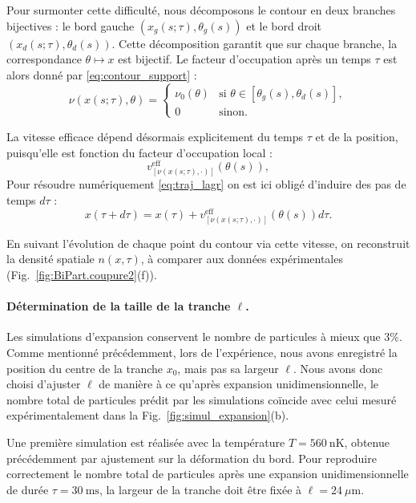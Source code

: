 Pour surmonter cette difficulté, nous décomposons le contour en deux branches bijectives : le bord gauche \((x_g(s;\tau), \theta_g(s))\) et le bord droit \((x_d(s;\tau), \theta_d(s))\). Cette décomposition garantit que sur chaque branche, la correspondance \(\theta \mapsto x\) est bijectif. Le facteur d’occupation après un temps \(\tau\) est alors donné par \eqref{eq:contour_support} :
\begin{equation}
\label{eq:contour_exp}
\nu ( x(s;\tau), \theta ) = 
\begin{cases}
\nu_0(\theta) & \text{si } \theta \in [\theta_g(s), \theta_d(s)], \\
0 & \text{sinon}.
\end{cases}
\end{equation}

La vitesse efficace dépend désormais explicitement du temps $\tau$ et de la position, puisqu’elle est fonction du facteur d’occupation local :
\[
v^{\mathrm{eff}}_{[\nu(x(s;\tau),\cdot)]}(\theta(s)),
\]
Pour résoudre numériquement \eqref{eq:traj_lagr} on est ici obligé d'induire des pas de temps $d\tau$ : 
\[
	x(\tau +d\tau ) = x(\tau ) + v^{\mathrm{eff}}_{[\nu(x(s;\tau),\cdot)]} (\theta(s))d \tau.
\]

En suivant l’évolution de chaque point du contour via cette vitesse, on reconstruit la densité spatiale \(n(x,\tau)\), à comparer aux données expérimentales (Fig.~\ref{fig:BiPart.coupure2}(f)).

\medskip

\paragraph{Détermination de la taille de la tranche \(\ell\).}

Les simulations d’expansion conservent le nombre de particules à mieux que \(3\%\). Comme mentionné précédemment, lors de l’expérience, nous avons enregistré la position du centre de la tranche \(x_0\), mais pas sa largeur \(\ell\).  
Nous avons donc choisi d’ajuster \(\ell\) de manière à ce qu’après expansion unidimensionnelle, le nombre total de particules prédit par les simulations coïncide avec celui mesuré expérimentalement dans la Fig.~\ref{fig:simul_expansion}(b).

\medskip

Une première simulation est réalisée avec la température \(T = 560~\mathrm{nK}\), obtenue précédemment par ajustement sur la déformation du bord.  
Pour reproduire correctement le nombre total de particules après une expansion unidimensionnelle de durée \(\tau = 30~\mathrm{ms}\), la largeur de la tranche doit être fixée à \(\ell = 24~\mu\mathrm{m}\). 

